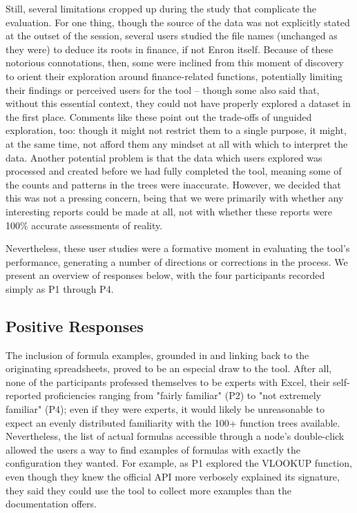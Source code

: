 \documentclass[conference]{IEEEtran}
\begin{document}
	Still, several limitations cropped up during the study that complicate the
	evaluation. For one thing, though the source of the data was not explicitly
	stated at the outset of the session, several users studied the file names
	(unchanged as they were) to deduce its roots in finance, if not Enron itself.
	Because of these notorious connotations, then, some were inclined from this
	moment of discovery to orient their exploration around finance-related
	functions, potentially limiting their findings or perceived users for the tool
	-- though some also said that, without this essential context, they could not
	have properly explored a dataset in the first place. Comments like these point
	out the trade-offs of unguided exploration, too: though it might not restrict
	them to a single purpose, it might, at the same time, not afford them any
	mindset at all with which to interpret the data. Another potential problem is
	that the data which users explored was processed and created before we had
	fully completed the tool, meaning some of the counts and patterns in the trees
	were inaccurate. However, we decided that this was not a pressing concern,
	being that we were primarily with whether any interesting reports could be made
	at all, not with whether these reports were 100\% accurate assessments of
	reality. \par
	
	Nevertheless, these user studies were a formative moment in evaluating the
	tool's performance, generating a number of directions or corrections in the
	process. We present an overview of responses below, with the four participants
	recorded simply as P1 through P4. \par
	
	\subsection{Positive Responses} The inclusion of formula examples, grounded in
	and linking back to the originating spreadsheets, proved to be an especial draw
	to the tool. After all, none of the participants professed themselves to be
	experts with Excel, their self-reported proficiencies ranging from "fairly
	familiar" (P2) to "not extremely familiar" (P4); even if they were experts, it
	would likely be unreasonable to expect an evenly distributed familiarity with
	the 100+ function trees available. Nevertheless, the list of actual formulas
	accessible through a node's double-click allowed the users a way to find
	examples of formulas with exactly the configuration they wanted. For example,
	as P1 explored the VLOOKUP function, even though they knew the official API
	more verbosely explained its signature, they said they could use the tool to
	collect more examples than the documentation offers. \par
	
\end{document}
